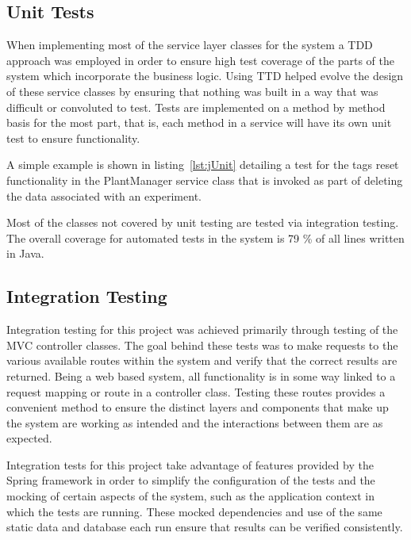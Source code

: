 \subsection{Unit Tests}

 When implementing most of the service layer classes for the system a TDD approach was employed in order to ensure high test coverage of the parts of the system which incorporate the business logic. Using TTD helped evolve the design of these service classes by ensuring that nothing was built in a way that was difficult or convoluted to test. Tests are implemented on a method by method basis for the most part, that is, each method in a service will have its own unit test to ensure functionality.
 
  A simple example is shown in listing~\ref{lst:jUnit} detailing a test for the tags reset functionality in the PlantManager service class that is invoked as part of deleting the data associated with an experiment.
\lstjava

Most of the classes not covered by unit testing are tested via integration testing. The overall coverage for automated tests in the system is 79 \% of all lines written in Java.

\subsection{Integration Testing}

Integration testing for this project was achieved primarily through testing of the MVC controller classes. The goal behind these tests was to make requests to the various available routes within the system and verify that the correct results are returned. Being a web based system, all functionality is in some way linked to a request mapping or route in a controller class. Testing these routes provides a convenient method to ensure the distinct layers and components that make up the system are working as intended and the interactions between them are as expected. 

Integration tests for this project take advantage of features provided by the Spring framework in order to simplify the configuration of the tests and the mocking of certain aspects of the system, such as the application context in which the tests are running. These mocked dependencies and use of the same static data and database each run ensure that results can be verified consistently.

